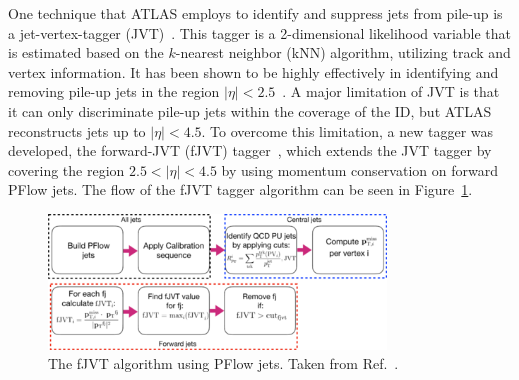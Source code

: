 One technique that ATLAS employs to identify and suppress jets from pile-up is a jet-vertex-tagger (JVT)~\cite{ATLAS:2014cva}. This tagger is a 2-dimensional likelihood variable that is estimated based on the $k$-nearest neighbor (kNN) algorithm, utilizing track and vertex information. It has been shown to be highly effectively in identifying and removing pile-up jets in the region $|\eta| < 2.5$~\cite{ATLAS:2015ull}. A major limitation of JVT is that it can only discriminate pile-up jets within the coverage of the ID, but ATLAS reconstructs jets up to $|\eta| < 4.5$. To overcome this limitation, a new tagger was developed, the forward-JVT (fJVT) tagger~\cite{ATLAS:2019ecn}, which extends the JVT tagger by covering the region $2.5 < |\eta| < 4.5$ by using momentum conservation on forward PFlow jets. The flow of the fJVT tagger algorithm can be seen in Figure~\ref{fig:reco_fjvt}.

\begin{figure}
  \centering
  \includegraphics[width=0.8\textwidth]{figures/reco/reco_fjvt.png}
  \caption{The fJVT algorithm using PFlow jets. Taken from Ref.~\cite{ATLAS:2019ecn}.}\label{fig:reco_fjvt}
\end{figure}